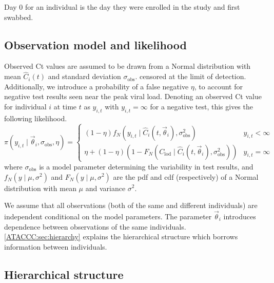 \documentclass[thesis.tex]{subfiles}
\begin{document}
Day 0 for an individual is the day they were enrolled in the study and first swabbed.

\subsection{Observation model and likelihood}

Observed Ct values are assumed to be drawn from a Normal distribution with mean $\hat{C}_i(t)$ and standard deviation $\sigma_\text{obs}$.
censored at the limit of detection.
Additionally, we introduce a probability of a false negative $\eta$, to account for negative test results seen near the peak viral load.
Denoting an observed Ct value for individual $i$ at time $t$ as $y_{i,t}$ with
$y_{i,t} = \infty$ for a negative test, this gives the following likelihood.
$$
\pi(y_{i,t} \mid \vec\theta_i, \sigma_\text{obs}, \eta) = \begin{cases}
  (1 - \eta) f_N(y_{i,t} \mid \hat{C}_i(t, \vec\theta_i), \sigma_\text{obs}^2) &y_{i,t} < \infty \\
  \eta + (1 - \eta) (1 - F_N(C_\text{lod} \mid \hat{C}_i(t, \vec\theta_i), \sigma_\text{obs}^2)) & y_{i,t} = \infty
\end{cases}
$$
where $\sigma_\text{obs}$ is a model parameter determining the variability in
test results, and $f_N(y \mid \mu, \sigma^2)$ and $F_N(y \mid \mu, \sigma^2)$ are the pdf
and cdf (respectively) of a Normal distribution with mean $\mu$ and variance $\sigma^2$.

We assume that all observations (both of the same and different individuals) are independent conditional on the model parameters.
The parameter $\vec\theta_i$ introduces dependence between observations of the same individuals.
\autoref{ATACCC:sec:hierarchy} explains the hierarchical structure which borrows information between individuals.

\subsection{Hierarchical structure}\label{ATACCC:sec:hierarchy}
\end{document}
